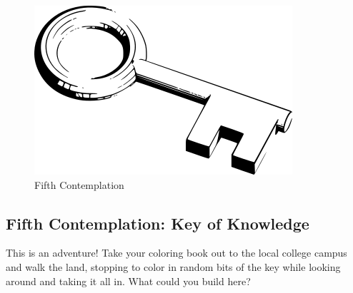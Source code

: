 \begin{figure}[htbp]
\centering
\includegraphics{images/contemplations/contemplation5C.png}
\caption{Fifth Contemplation}
\end{figure}

\subsection{Fifth Contemplation: Key of
Knowledge}\label{fifth-contemplation-key-of-knowledge}

This is an adventure! Take your coloring book out to the local college
campus and walk the land, stopping to color in random bits of the key
while looking around and taking it all in. What could you build here?

